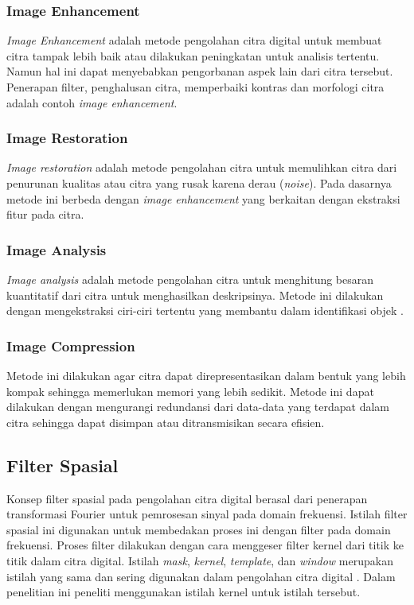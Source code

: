 \subsubsection{Image Enhancement}
\textit{Image Enhancement} adalah metode pengolahan citra digital untuk membuat citra tampak lebih baik atau dilakukan peningkatan untuk analisis tertentu. Namun hal ini dapat menyebabkan pengorbanan aspek lain dari citra tersebut. Penerapan filter, penghalusan citra, memperbaiki kontras dan morfologi citra adalah contoh \textit{image enhancement}.

\subsubsection{Image Restoration}
\textit{Image restoration} adalah metode pengolahan citra untuk memulihkan citra dari penurunan kualitas atau citra yang rusak karena derau (\textit{noise}). Pada dasarnya metode ini berbeda dengan \textit{image enhancement} yang berkaitan dengan ekstraksi fitur pada citra. 

\subsubsection{Image Analysis}
\textit{Image analysis} adalah metode pengolahan citra untuk menghitung besaran kuantitatif dari citra untuk menghasilkan deskripsinya. Metode ini dilakukan dengan mengekstraksi ciri-ciri tertentu yang membantu dalam identifikasi objek \cite{book:dasilva}.

\subsubsection{Image Compression}
Metode ini dilakukan agar citra dapat direpresentasikan dalam bentuk yang lebih kompak sehingga memerlukan memori yang lebih sedikit. Metode ini dapat dilakukan dengan mengurangi redundansi dari data-data yang terdapat dalam citra sehingga dapat disimpan atau ditransmisikan secara efisien.


\subsection{Filter Spasial}
Konsep filter spasial pada pengolahan citra digital berasal dari penerapan transformasi Fourier untuk pemrosesan sinyal pada domain frekuensi. Istilah filter spasial ini digunakan untuk membedakan proses ini dengan filter pada domain frekuensi. Proses filter dilakukan dengan cara menggeser filter kernel dari titik ke titik dalam citra digital. Istilah \textit{mask}, \textit{kernel}, \textit{template}, dan \textit{window} merupakan istilah yang sama dan sering digunakan dalam pengolahan citra digital \cite{book:gonzalez}. Dalam penelitian ini peneliti menggunakan istilah kernel untuk istilah tersebut.

